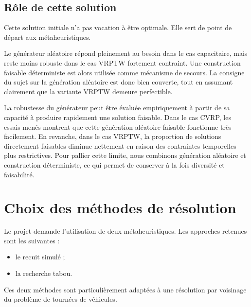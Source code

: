 \documentclass[11pt,a4paper]{article}
\begin{document}
\subsection{Rôle de cette solution}
Cette solution initiale n'a pas vocation à être optimale. Elle sert de point de départ aux métaheuristiques.

Le générateur aléatoire répond pleinement au besoin dans le cas capacitaire, mais reste moins robuste dans le cas VRPTW fortement contraint. Une construction faisable déterministe est alors utilisée comme mécanisme de secours. La consigne du sujet sur la génération aléatoire est donc bien couverte, tout en assumant clairement que la variante VRPTW demeure perfectible.

La robustesse du générateur peut être évaluée empiriquement à partir de sa capacité à produire rapidement une solution faisable. Dans le cas CVRP, les essais menés montrent que cette génération aléatoire faisable fonctionne très facilement. En revanche, dans le cas VRPTW, la proportion de solutions directement faisables diminue nettement en raison des contraintes temporelles plus restrictives. Pour pallier cette limite, nous combinons génération aléatoire et construction déterministe, ce qui permet de conserver à la fois diversité et faisabilité.

\section{Choix des méthodes de résolution}
\label{sec:metaheuristiques}

Le projet demande l'utilisation de deux métaheuristiques. Les approches retenues sont les suivantes :
\begin{itemize}
    \item le recuit simulé ;
    \item la recherche tabou.
\end{itemize}

Ces deux méthodes sont particulièrement adaptées à une résolution par voisinage du problème de tournées de véhicules.
\end{document}
